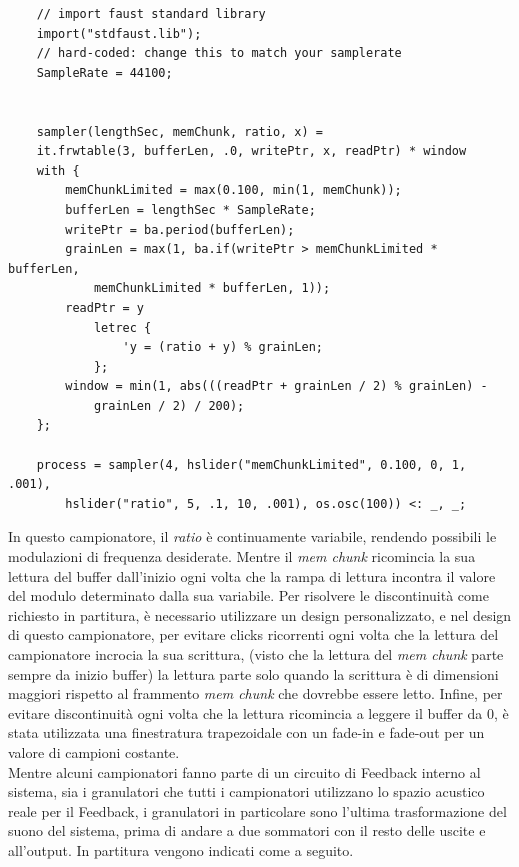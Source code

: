 \vspace{0.5cm}
\begin{lstlisting}
    // import faust standard library
    import("stdfaust.lib");
    // hard-coded: change this to match your samplerate
    SampleRate = 44100;
    
    
    sampler(lengthSec, memChunk, ratio, x) = 
    it.frwtable(3, bufferLen, .0, writePtr, x, readPtr) * window
    with {
        memChunkLimited = max(0.100, min(1, memChunk));
        bufferLen = lengthSec * SampleRate;
        writePtr = ba.period(bufferLen);
        grainLen = max(1, ba.if(writePtr > memChunkLimited * bufferLen, 
            memChunkLimited * bufferLen, 1));
        readPtr = y
            letrec {
                'y = (ratio + y) % grainLen;
            };
        window = min(1, abs(((readPtr + grainLen / 2) % grainLen) - 
            grainLen / 2) / 200);
    };
    
    process = sampler(4, hslider("memChunkLimited", 0.100, 0, 1, .001), 
        hslider("ratio", 5, .1, 10, .001), os.osc(100)) <: _, _;
\end{lstlisting}

In questo campionatore, il \textit{ratio} è continuamente variabile, 
rendendo possibili le modulazioni di frequenza desiderate. 
Mentre il \textit{mem chunk} ricomincia la sua lettura del buffer dall'inizio 
ogni volta che la rampa di lettura incontra il valore del modulo determinato dalla sua variabile.
Per risolvere le discontinuità come richiesto in partitura, 
è necessario utilizzare un design personalizzato,
e nel design di questo campionatore, 
per evitare clicks ricorrenti ogni volta che la lettura del campionatore incrocia la sua scrittura, 
(visto che la lettura del \textit{mem chunk} parte sempre da inizio buffer)
la lettura parte solo quando la scrittura è di dimensioni maggiori rispetto al frammento \textit{mem chunk} 
che dovrebbe essere letto.
Infine, per evitare discontinuità ogni volta che la lettura ricomincia a leggere il buffer da 0, 
è stata utilizzata una finestratura trapezoidale con un fade-in e fade-out 
per un valore di campioni costante. \\
Mentre alcuni campionatori fanno parte di un circuito di Feedback interno al sistema, 
sia i granulatori che tutti i campionatori utilizzano lo spazio acustico reale per il Feedback,
i granulatori in particolare sono l'ultima trasformazione del suono del sistema, prima di andare a 
due sommatori con il resto delle uscite e all'output.
In partitura vengono indicati come a seguito.

